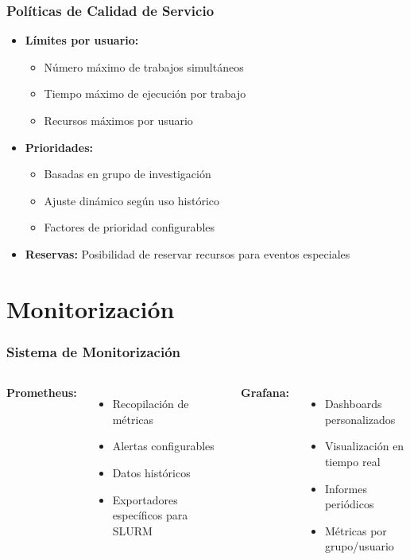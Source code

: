 \documentclass[aspectratio=169]{beamer}
\begin{document}
\begin{frame}
\frametitle{Políticas de Calidad de Servicio}
\begin{itemize}
    \item \textbf{Límites por usuario:}
    \begin{itemize}
        \item Número máximo de trabajos simultáneos
        \item Tiempo máximo de ejecución por trabajo
        \item Recursos máximos por usuario
    \end{itemize}
    
    \item \textbf{Prioridades:}
    \begin{itemize}
        \item Basadas en grupo de investigación
        \item Ajuste dinámico según uso histórico
        \item Factores de prioridad configurables
    \end{itemize}
    
    \item \textbf{Reservas:} Posibilidad de reservar recursos para eventos especiales
\end{itemize}
\end{frame}

\section{Monitorización}

\begin{frame}
\frametitle{Sistema de Monitorización}
\begin{columns}
\textbf{Prometheus:}
\begin{itemize}
    \item Recopilación de métricas
    \item Alertas configurables
    \item Datos históricos
    \item Exportadores específicos para SLURM
\end{itemize}

\textbf{Grafana:}
\begin{itemize}
    \item Dashboards personalizados
    \item Visualización en tiempo real
    \item Informes periódicos
    \item Métricas por grupo/usuario
\end{itemize}
\end{columns}
\end{frame}
\end{document}
